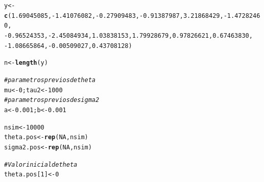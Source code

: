 \documentclass[10pt,openright]{book}\usepackage[]{graphicx}\usepackage[]{color}
\makeatletter
\newcommand{\hlnum}[1]{\textcolor[rgb]{0.686,0.059,0.569}{#1}}%
\newcommand{\hlcom}[1]{\textcolor[rgb]{0.678,0.584,0.686}{\textit{#1}}}%
\newcommand{\hlopt}[1]{\textcolor[rgb]{0,0,0}{#1}}%
\newcommand{\hlstd}[1]{\textcolor[rgb]{0.345,0.345,0.345}{#1}}%
\newcommand{\hlkwb}[1]{\textcolor[rgb]{0.69,0.353,0.396}{#1}}%
\newcommand{\hlkwd}[1]{\textcolor[rgb]{0.737,0.353,0.396}{\textbf{#1}}}%
\newenvironment{kframe}{%
 \def\at@end@of@kframe{}%
 \ifinner\ifhmode%
  \def\at@end@of@kframe{\end{minipage}}%
  \begin{minipage}{\columnwidth}%
 \fi\fi%
 \def\FrameCommand##1{\hskip\@totalleftmargin \hskip-\fboxsep
 \colorbox{shadecolor}{##1}\hskip-\fboxsep
     \hskip-\linewidth \hskip-\@totalleftmargin \hskip\columnwidth}%
 \MakeFramed {\advance\hsize-\width
   \@totalleftmargin\z@ \linewidth\hsize
   \@setminipage}}%
 {\par\unskip\endMakeFramed%
 \at@end@of@kframe}
\newenvironment{knitrout}{}{} %
\makeatother
\begin{document}
\begin{Eje}
\begin{knitrout}
\begin{kframe}
{\ttfamily\noindent\itshape\color{messagecolor}{\#\# \#\# (Grants SES-0350646 and SES-0350613)\\\#\# \#\#}}\begin{alltt}
\hlstd{y} \hlkwb{<-} \hlkwd{c}\hlstd{(}\hlnum{1.69045085}\hlstd{,} \hlopt{-}\hlnum{1.41076082}\hlstd{,} \hlopt{-}\hlnum{0.27909483}\hlstd{,} \hlopt{-}\hlnum{0.91387987}\hlstd{,} \hlnum{3.21868429}\hlstd{,} \hlopt{-}\hlnum{1.47282460}\hlstd{,}
       \hlopt{-}\hlnum{0.96524353}\hlstd{,} \hlopt{-}\hlnum{2.45084934}\hlstd{,} \hlnum{1.03838153}\hlstd{,} \hlnum{1.79928679}\hlstd{,} \hlnum{0.97826621}\hlstd{,} \hlnum{0.67463830}\hlstd{,}
       \hlopt{-}\hlnum{1.08665864}\hlstd{,} \hlopt{-}\hlnum{0.00509027}\hlstd{,} \hlnum{0.43708128}\hlstd{)}

\hlstd{n} \hlkwb{<-} \hlkwd{length}\hlstd{(y)}

\hlcom{#parametros previos de theta}
\hlstd{mu} \hlkwb{<-} \hlnum{0}\hlstd{; tau2} \hlkwb{<-} \hlnum{1000}
\hlcom{#parametros previos de sigma2}
\hlstd{a} \hlkwb{<-} \hlnum{0.001}\hlstd{; b} \hlkwb{<-} \hlnum{0.001}

\hlstd{nsim} \hlkwb{<-} \hlnum{10000}
\hlstd{theta.pos} \hlkwb{<-} \hlkwd{rep}\hlstd{(}\hlnum{NA}\hlstd{,nsim)}
\hlstd{sigma2.pos} \hlkwb{<-} \hlkwd{rep}\hlstd{(}\hlnum{NA}\hlstd{,nsim)}

\hlcom{# Valor inicial de theta}
\hlstd{theta.pos[}\hlnum{1}\hlstd{]} \hlkwb{<-} \hlnum{0}


\end{alltt}
\end{kframe}
\end{knitrout}
\end{Eje}
\end{document}

